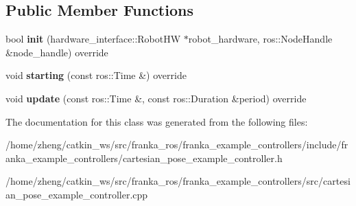 \subsection*{Public Member Functions}
\begin{DoxyCompactItemize}
\item 
\mbox{\label{classfranka__example__controllers_1_1_cartesian_pose_example_controller_a461de40a8f5d8a76b80b25fc581e0376}} 
bool {\bfseries init} (hardware\+\_\+interface\+::\+Robot\+HW $\ast$robot\+\_\+hardware, ros\+::\+Node\+Handle \&node\+\_\+handle) override
\item 
\mbox{\label{classfranka__example__controllers_1_1_cartesian_pose_example_controller_a80a14c57df1285078330b8d70bd7308b}} 
void {\bfseries starting} (const ros\+::\+Time \&) override
\item 
\mbox{\label{classfranka__example__controllers_1_1_cartesian_pose_example_controller_aaecae953c1aeeaa8d08b569f0ef4723d}} 
void {\bfseries update} (const ros\+::\+Time \&, const ros\+::\+Duration \&period) override
\end{DoxyCompactItemize}


The documentation for this class was generated from the following files\+:\begin{DoxyCompactItemize}
\item 
/home/zheng/catkin\+\_\+ws/src/franka\+\_\+ros/franka\+\_\+example\+\_\+controllers/include/franka\+\_\+example\+\_\+controllers/cartesian\+\_\+pose\+\_\+example\+\_\+controller.\+h\item 
/home/zheng/catkin\+\_\+ws/src/franka\+\_\+ros/franka\+\_\+example\+\_\+controllers/src/cartesian\+\_\+pose\+\_\+example\+\_\+controller.\+cpp\end{DoxyCompactItemize}
